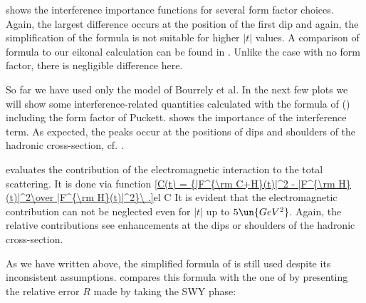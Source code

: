  shows the interference importance functions for several form factor choices. Again, the largest difference occurs at the position of the first dip and again, the simplification of the \WaY{} formula is not suitable for higher $|t|$ values. A comparison of \KL{} formula to our eikonal calculation can be found in . Unlike the case with no form factor, there is negligible difference here.






So far we have used only the model of Bourrely et al. In the next few plots we will show some interference-related quantities calculated with the formula of \KaL{} () including the form factor of Puckett.  shows the importance of the interference term. As expected, the peaks occur at the positions of dips and shoulders of the hadronic cross-section, cf. .


 evaluates the contribution of the electromagnetic interaction to the total scattering. It is done via function
\eqref{C(t) = {|F^{\rm C+H}(t)|^2 - |F^{\rm H}(t)|^2\over |F^{\rm H}(t)|^2}\ .}{el C}
It is evident that the electromagnetic contribution can not be neglected even for $|t|$ up to $5\un{GeV^2}$. Again, the relative contributions see enhancements at the dips or shoulders of the hadronic cross-section.


As we have written above, the simplified formula of \WaY{} is still used despite its inconsistent assumptions.  compares this formula with the one of \KaL{} by presenting the relative error $R$ made by taking the SWY phase:

